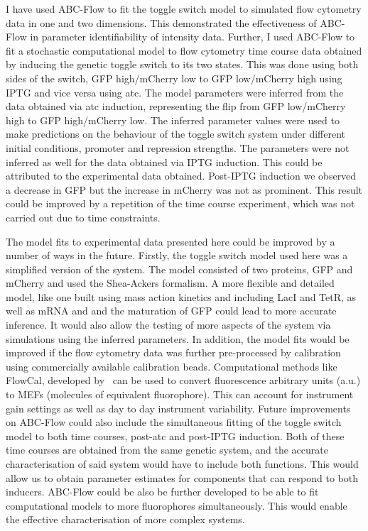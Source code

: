 I have used ABC-Flow to fit the toggle switch model to simulated flow cytometry data in one and two dimensions. This demonstrated the effectiveness of ABC-Flow in parameter identifiability of intensity data. Further, I used ABC-Flow to fit a stochastic computational model to flow cytometry time course data obtained by inducing the genetic toggle switch to its two states. This was done using both sides of the switch, GFP high/mCherry low to GFP low/mCherry high using IPTG and vice versa using \acrshort{atc}. The model parameters were inferred from the data obtained via \acrshort{atc} induction, representing the flip from GFP low/mCherry high to GFP high/mCherry low. The inferred parameter values were used to make predictions on the behaviour of the toggle switch system under different initial conditions, promoter and repression strengths. The parameters were not inferred as well for the data obtained via IPTG induction. This could be attributed to the experimental data obtained. Post-IPTG induction we observed a decrease in GFP but the increase in mCherry was not as prominent. This result could be improved by a repetition of the time course experiment, which was not carried out due to time constraints.


The model fits to experimental data presented here could be improved by a number of ways in the future. Firstly, the toggle switch model used here was a simplified version of the system. The model consisted of two proteins, GFP and mCherry and used the Shea-Ackers formalism. A more flexible and detailed model, like one built using mass action kinetics and including LacI and TetR, as well as mRNA and and the maturation of GFP could lead to more accurate inference. It would also allow the testing of more aspects of the system via simulations using the inferred parameters. In addition, the model fits would be improved if the flow cytometry data was further pre-processed by calibration using commercially available calibration beads. Computational methods like FlowCal, developed by~\textcite{Tabor:2009bz} can be used to convert fluorescence arbitrary units (a.u.) to MEFs (molecules of equivalent fluorophore). This can account for instrument gain settings as well as day to day instrument variability. Future improvements on ABC-Flow could also include the simultaneous fitting of the toggle switch model to both time courses, post-\acrshort{atc} and post-IPTG induction. Both of these time courses are obtained from the same genetic system, and the accurate characterisation of said system would have to include both functions. This would allow us to obtain parameter estimates for components that can respond to both inducers. ABC-Flow could be also be further developed to be able to fit computational models to more fluorophores simultaneously. This would enable the effective characterisation of more complex systems.

